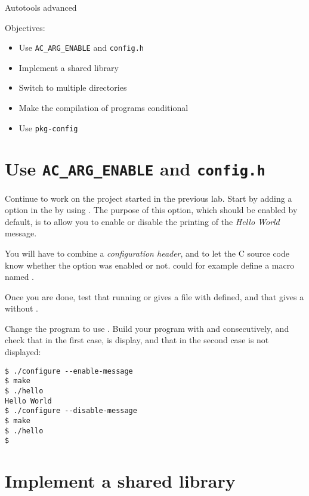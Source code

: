\subchapter
{Autotools advanced}
{Objectives:
  \begin{itemize}
  \item Use {\tt AC\_ARG\_ENABLE} and {\tt config.h}
  \item Implement a shared library
  \item Switch to multiple directories
  \item Make the compilation of programs conditional
  \item Use {\tt pkg-config}
  \end{itemize}
}

\section{Use {\tt AC\_ARG\_ENABLE} and {\tt config.h}}

Continue to work on the project started in the previous lab. Start by
adding a  option in the  by
using . The purpose of this option, which should
be enabled by default, is to allow you to enable or disable the
printing of the {\em Hello World} message.

You will have to combine a {\em configuration header}, and
 to let the C source code know whether the option was
enabled or not.  could for example define a macro
named .

Once you are done, test that running  or
 gives a  file with
 defined, and that  gives a  without
.

Change the  program to use
. Build your  program with
 and  consecutively,
and check that in the first case,  is display, and
that in the second case  is not displayed:

\begin{verbatim}
$ ./configure --enable-message
$ make
$ ./hello
Hello World
$ ./configure --disable-message
$ make
$ ./hello
$
\end{verbatim}

\section{Implement a shared library}

